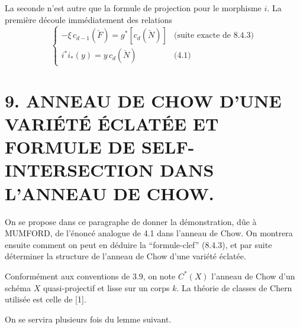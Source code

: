 La seconde n'est autre que la formule de projection pour le morphisme $i$. La première découle immédiatement des relations
\[
\begin{cases}
-\xi\,c_{d-1}(\check F)=g^*[c_d(\check N)]&\text{(suite exacte de 8.4.3)}\\
i^*i_*(y)=y\,c_d(\check N)&\text{(4.1)}
\end{cases}
\]

\section*{9. ANNEAU DE CHOW D'UNE VARIÉTÉ ÉCLATÉE ET FORMULE DE SELF-INTERSECTION DANS L'ANNEAU DE CHOW.}

On se propose dans ce paragraphe de donner la démonstration, dûe à MUMFORD, de l'énoncé analogue de 4.1 dans l'anneau de Chow. On montrera ensuite comment on peut en déduire la ``formule-clef'' (8.4.3), et par suite déterminer la structure de l'anneau de Chow d'une variété éclatée.

Conformément aux conventions de 3.9, on note $C^*(X)$ l'anneau de Chow d'un schéma $X$ quasi-projectif et lisse sur un corps $k$. La théorie de classes de Chern utilisée est celle de [1].

On se servira plusieurs fois du lemme suivant.

